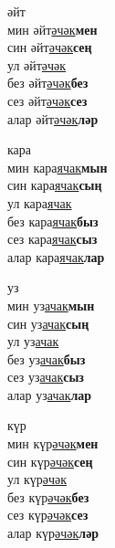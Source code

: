 \begin{multicols}{4}
\begin{enumerate}
\begin{minipage}{\linewidth}
    \item
    әйт\\
    мин әйт\underline{әчәк}\textbf{мен}\\
    син әйт\underline{әчәк}\textbf{сең}\\
    ул әйт\underline{әчәк}\\
    без әйт\underline{әчәк}\textbf{без}\\
    сез әйт\underline{әчәк}\textbf{сез}\\
    алар әйт\underline{әчәк}\textbf{ләр}\\
\end{minipage}

\begin{minipage}{\linewidth}
    \item
    кара\\
    мин кара\underline{ячак}\textbf{мын}\\
    син кара\underline{ячак}\textbf{сың}\\
    ул кара\underline{ячак}\\
    без кара\underline{ячак}\textbf{быз}\\
    сез кара\underline{ячак}\textbf{сыз}\\
    алар кара\underline{ячак}\textbf{лар}\\
\end{minipage}

\begin{minipage}{\linewidth}
    \item
    уз\\
    мин уз\underline{ачак}\textbf{мын}\\
    син уз\underline{ачак}\textbf{сың}\\
    ул уз\underline{ачак}\\
    без уз\underline{ачак}\textbf{быз}\\
    сез уз\underline{ачак}\textbf{сыз}\\
    алар уз\underline{ачак}\textbf{лар}\\
\end{minipage}

\begin{minipage}{\linewidth}
    \item
    күр\\
    мин күр\underline{әчәк}\textbf{мен}\\
    син күр\underline{әчәк}\textbf{сең}\\
    ул күр\underline{әчәк}\\
    без күр\underline{әчәк}\textbf{без}\\
    сез күр\underline{әчәк}\textbf{сез}\\
    алар күр\underline{әчәк}\textbf{ләр}\\
\end{minipage}


\end{enumerate}
\end{multicols}
